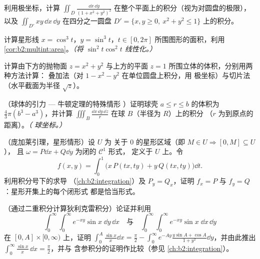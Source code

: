 \begin{exercise}[$\star\star$]\label{exo:b2:multint:4}
利用极坐标，计算 $\iint_D \frac{\dd x\,\dd y}{(1 +
x^2 + y^2)^2}$ 在整个平面上的积分（视为对圆盘的极限），以及
$\iint_{D'} xy\,\dd x\,\dd y$ 在四分之一圆盘 $D' = \{x, y
\geq 0,\ x^2 + y^2 \leq 1\}$ 上的积分。
\end{exercise}

\begin{exercise}[$\star\star$]\label{exo:b2:multint:5}
计算星形线 $x = \cos^3 t$，$y =
\sin^3 t$，$t \in [0, 2\pi]$ 所围图形的面积，利用
\cref{cor:b2:multint:area}。\emph{（将 $\sin^2 t\cos^2 t$ 线性化。）}
\end{exercise}

\begin{exercise}[$\star\star$]\label{exo:b2:multint:6}
计算由下方的抛物面 $z
= x^2 + y^2$ 与上方的平面 $z = 1$ 所围立体的体积，分别用两种方法计算：
叠加法（对 $1 - x^2 - y^2$ 在单位圆盘上积分，用
极坐标）与切片法（水平截面为半径
$\sqrt z$）。
\end{exercise}

\begin{exercise}[$\star\star$]\label{exo:b2:multint:7}
（球体的引力 --- 牛顿定理的特殊情形
）证明球壳 $a \leq r \leq
b$ 的体积为 $\frac43\pi(b^3 - a^3)$，并计算 $\iiint_{B}
\frac{\dd x\,\dd y\,\dd z}{r}$ 在球 $B$（半径为 $R$）上的积分
（$r$ 为到原点的距离）。\emph{（
球坐标。）}
\end{exercise}

\begin{exercise}[$\star\star\star$]\label{exo:b2:multint:8}
（庞加莱引理，星形情形）设 $U$ 为
关于 $0$ 的星形区域（即 $M \in U \Rightarrow [0, M] \subseteq U$），
且 $\omega = P\dd x + Q\dd y$ 为闭的 $\mathcal{C}^1$ 形式，
定义于 $U$ 上。令
\[
f(x, y) = \int_0^1 \bigl(x\,P(tx, ty) + y\,Q(tx, ty)\bigr)\dd t .
\]
利用积分号下的求导
（\cref{ch:b2:integration}）及 $P_y = Q_x$，证明 $f_x = P$
与 $f_y = Q$：星形开集上的每个闭形式
都是恰当形式。
\end{exercise}

\begin{exercise}[$\star\star\star$]\label{exo:b2:multint:9}
（通过二重积分计算狄利克雷积分）论证并利用
\[
\int_0^\infty\!\!\int_0^\infty e^{-xy}\sin x\;\dd y\,\dd x
\quad\text{与}\quad
\int_0^\infty\!\!\int_0^\infty e^{-xy}\sin x\;\dd x\,\dd y
\]
在 $[0, A] \times [0, \infty)$ 上，证明 $\int_0^A \frac{\sin
x}{x}\dd x = \frac\pi2 - \int_0^\infty
e^{-Ay}\frac{y\sin A + \cos A}{1 + y^2}\dd y$，并由此推出
$\int_0^\infty \frac{\sin x}{x}\,\dd x = \frac\pi2$，并与
含参积分的证明作比较（参见
\cref{ch:b2:integration}）。
\end{exercise}

